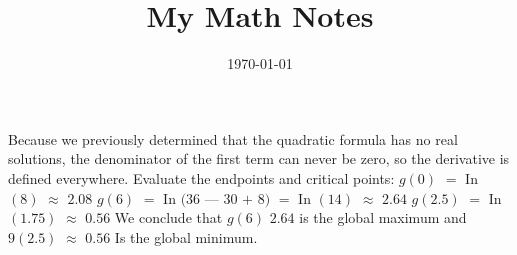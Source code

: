 \documentclass{article}%
\title{My Math Notes}%
\date{\today}%
\begin{document}
%
\normalsize%
\maketitle%
Because we previously determined that the quadratic formula has no real solutions, the denominator of the first term can never be zero, so the derivative is defined everywhere. Evaluate the endpoints and critical points: %
$g(0)$%
$=$%
 In %
$(8)$%
$\approx$%
$2.08$%
$g(6)$%
$=$%
 In %
$(36$%
$—$%
$30$%
$+$%
$8)$%
$=$%
 In %
$(14)$%
$\approx$%
$2.64$%
$g(2.5)$%
$=$%
 In %
$(1.75)$%
$\approx$%
$0.56$%
 We conclude that %
$g(6)$%
$2.64$%
 is the global maximum and %
$9(2.5)$%
$\approx$%
$0.56$%
 Is the global minimum. %
\end{document}
